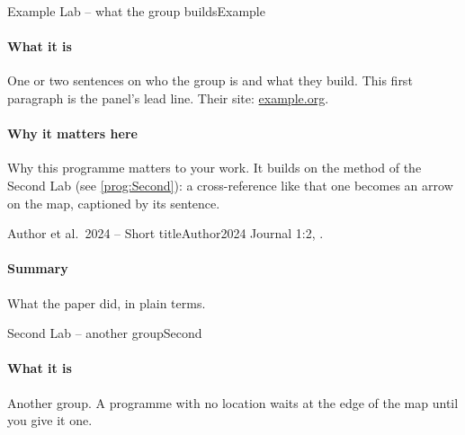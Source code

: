 \documentclass[11pt, a4paper]{article}
\begin{document}
\tableofcontents
\clearpage

\begin{programnote}{Example Lab -- what the group builds}{Example}

\paragraph{What it is}
One or two sentences on who the group is and what they build. This first
paragraph is the panel's lead line. Their site: \href{https://example.org}{example.org}.

\paragraph{Why it matters here}
Why this programme matters to your work. It builds on the method of the Second
Lab (see \ref{prog:Second}): a cross-reference like that one becomes an arrow
on the map, captioned by its sentence. 

\begin{papernote}{Author et al.\ 2024 -- Short title}{Author2024}
Journal 1:2, .    %

\paragraph{Summary}
What the paper did, in plain terms. 

\end{papernote}

\end{programnote}

\begin{programnote}{Second Lab -- another group}{Second}

\paragraph{What it is}
Another group. A programme with no location waits at the edge of the map
until you give it one.

\end{programnote}
\end{document}
